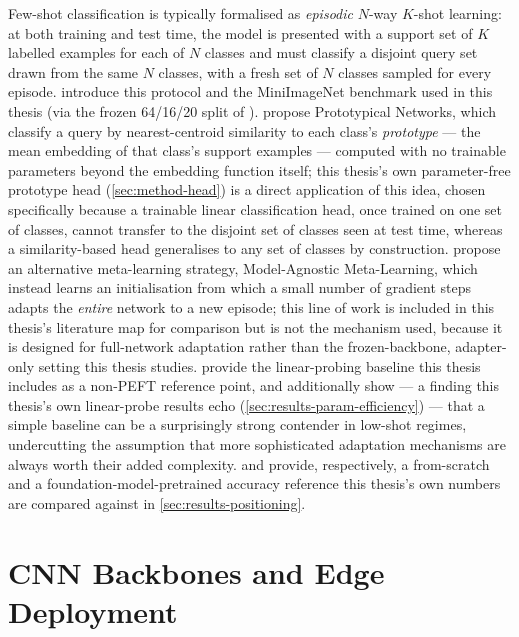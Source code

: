 \documentclass{iutbscthesis}
\begin{document}
Few-shot classification is typically formalised as \emph{episodic} $N$-way $K$-shot learning: at both training and test time, the model is presented with a support set of $K$ labelled examples for each of $N$ classes and must classify a disjoint query set drawn from the same $N$ classes, with a fresh set of $N$ classes sampled for every episode. \textcite{vinyals2016matching} introduce this protocol and the MiniImageNet benchmark used in this thesis (via the frozen 64/16/20 split of \textcite{ravi2017optimization}). \textcite{snell2017protonet} propose Prototypical Networks, which classify a query by nearest-centroid similarity to each class's \emph{prototype} — the mean embedding of that class's support examples — computed with no trainable parameters beyond the embedding function itself; this thesis's own parameter-free prototype head (\autoref{sec:method-head}) is a direct application of this idea, chosen specifically because a trainable linear classification head, once trained on one set of classes, cannot transfer to the disjoint set of classes seen at test time, whereas a similarity-based head generalises to any set of classes by construction. \textcite{finn2017maml} propose an alternative meta-learning strategy, Model-Agnostic Meta-Learning, which instead learns an initialisation from which a small number of gradient steps adapts the \emph{entire} network to a new episode; this line of work is included in this thesis's literature map for comparison but is not the mechanism used, because it is designed for full-network adaptation rather than the frozen-backbone, adapter-only setting this thesis studies. \textcite{chen2019closerlook} provide the linear-probing baseline this thesis includes as a non-PEFT reference point, and additionally show — a finding this thesis's own linear-probe results echo (\autoref{sec:results-param-efficiency}) — that a simple baseline can be a surprisingly strong contender in low-shot regimes, undercutting the assumption that more sophisticated adaptation mechanisms are always worth their added complexity. \textcite{lee2019metaoptnet} and \textcite{hu2022pmf} provide, respectively, a from-scratch and a foundation-model-pretrained accuracy reference this thesis's own numbers are compared against in \autoref{sec:results-positioning}.

\section{CNN Backbones and Edge Deployment}
\label{sec:related-cnn}
\end{document}
